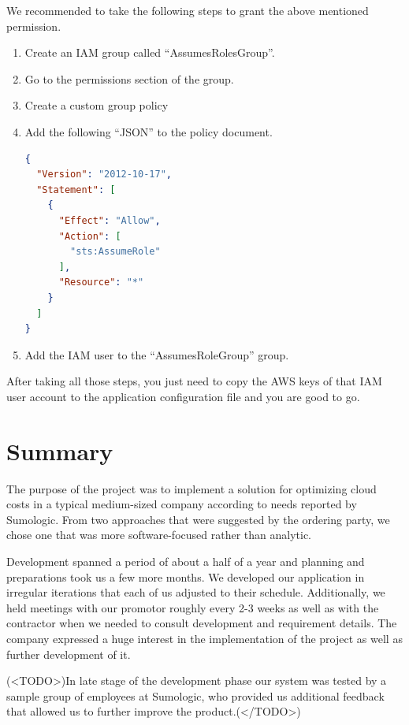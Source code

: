\documentclass[licencjacka,en]{thesisclass}
\begin{document}
We recommended to take the following steps to grant the above mentioned permission.



\begin{enumerate}

\item Create an IAM group called “AssumesRolesGroup”.
\item Go to the permissions section of the group.
\item Create a custom group policy
\item Add the following “JSON” to the policy document.

\begin{lstlisting}[language=json,firstnumber=1]
{
  "Version": "2012-10-17",
  "Statement": [
    {
      "Effect": "Allow",
      "Action": [
        "sts:AssumeRole"
      ],
      "Resource": "*"
    }
  ]
}
\end{lstlisting}

\item Add the IAM user to the “AssumesRoleGroup” group.
\end{enumerate}

After taking all those steps, you just need to copy the AWS keys of that IAM user account to the application configuration file and you are good to go.


    \chapter{Summary}
    The purpose of the project was to implement a solution for optimizing cloud costs
    in a typical medium-sized company according to needs reported by Sumologic.
    From two approaches that were suggested by the ordering party,
    we chose one that was more software-focused rather than analytic.

    Development spanned a period of about a half of a year and planning and preparations took us
    a few more months.
    We developed our application in irregular iterations that each of us adjusted
    to their schedule.
    Additionally, we held meetings with our promotor roughly every 2-3 weeks
    as well as with the contractor when we needed to consult development and requirement details.
    The company expressed a huge interest in the implementation of the project
    as well as further development of it.

    (<TODO>)In late stage of the development phase our system was tested
    by a sample group of employees at Sumologic, who provided us additional feedback
    that allowed us to further improve the product.(</TODO>)
\end{document}
